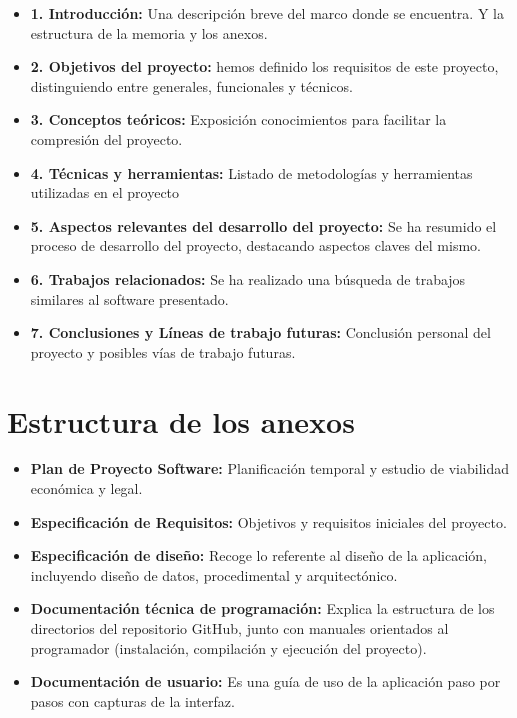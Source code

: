 \begin{itemize}
    \item \textbf{1. Introducción:} Una descripción breve del marco donde se encuentra. Y la estructura de la memoria y los anexos.
    \item \textbf{2. Objetivos del proyecto:} hemos definido los requisitos de este proyecto, distinguiendo entre generales, funcionales y técnicos.
    \item \textbf{3. Conceptos teóricos:} Exposición conocimientos para facilitar la compresión del proyecto.
    \item \textbf{4. Técnicas y herramientas:} Listado de metodologías y herramientas utilizadas en el proyecto
    \item \textbf{5. Aspectos relevantes del desarrollo del proyecto:} Se ha resumido el proceso de desarrollo del proyecto, destacando aspectos claves del mismo.
    \item \textbf{6. Trabajos relacionados:} Se ha realizado una búsqueda de trabajos similares al software presentado.
    \item \textbf{7. Conclusiones y Líneas de trabajo futuras:} Conclusión personal del proyecto y posibles vías de trabajo futuras.
\end{itemize}

\section{Estructura de los anexos}

\begin{itemize}
    \item \textbf{Plan de Proyecto Software:} Planificación temporal y estudio de viabilidad económica y legal.
    \item \textbf{Especificación de Requisitos:} Objetivos y requisitos iniciales del proyecto.
    \item \textbf{Especificación de diseño:} Recoge lo referente al diseño de la aplicación, incluyendo diseño de datos, procedimental y arquitectónico.
    \item \textbf{Documentación técnica de programación:} Explica la estructura de los directorios del repositorio GitHub, junto con manuales orientados al programador (instalación, compilación y ejecución del proyecto).
    \item \textbf{Documentación de usuario:} Es una guía de uso de la aplicación paso por pasos con capturas de la interfaz.
\end{itemize}